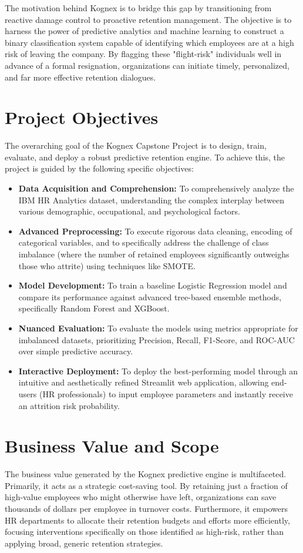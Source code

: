 The motivation behind Kognex is to bridge this gap by transitioning from reactive damage control to proactive retention management. The objective is to harness the power of predictive analytics and machine learning to construct a binary classification system capable of identifying which employees are at a high risk of leaving the company. By flagging these "flight-risk" individuals well in advance of a formal resignation, organizations can initiate timely, personalized, and far more effective retention dialogues.

\section{Project Objectives}
The overarching goal of the Kognex Capstone Project is to design, train, evaluate, and deploy a robust predictive retention engine. To achieve this, the project is guided by the following specific objectives:
\begin{itemize}
    \item \textbf{Data Acquisition and Comprehension:} To comprehensively analyze the IBM HR Analytics dataset, understanding the complex interplay between various demographic, occupational, and psychological factors.
    \item \textbf{Advanced Preprocessing:} To execute rigorous data cleaning, encoding of categorical variables, and to specifically address the challenge of class imbalance (where the number of retained employees significantly outweighs those who attrite) using techniques like SMOTE.
    \item \textbf{Model Development:} To train a baseline Logistic Regression model and compare its performance against advanced tree-based ensemble methods, specifically Random Forest and XGBoost.
    \item \textbf{Nuanced Evaluation:} To evaluate the models using metrics appropriate for imbalanced datasets, prioritizing Precision, Recall, F1-Score, and ROC-AUC over simple predictive accuracy.
    \item \textbf{Interactive Deployment:} To deploy the best-performing model through an intuitive and aesthetically refined Streamlit web application, allowing end-users (HR professionals) to input employee parameters and instantly receive an attrition risk probability.
\end{itemize}

\section{Business Value and Scope}
The business value generated by the Kognex predictive engine is multifaceted. Primarily, it acts as a strategic cost-saving tool. By retaining just a fraction of high-value employees who might otherwise have left, organizations can save thousands of dollars per employee in turnover costs. Furthermore, it empowers HR departments to allocate their retention budgets and efforts more efficiently, focusing interventions specifically on those identified as high-risk, rather than applying broad, generic retention strategies.

